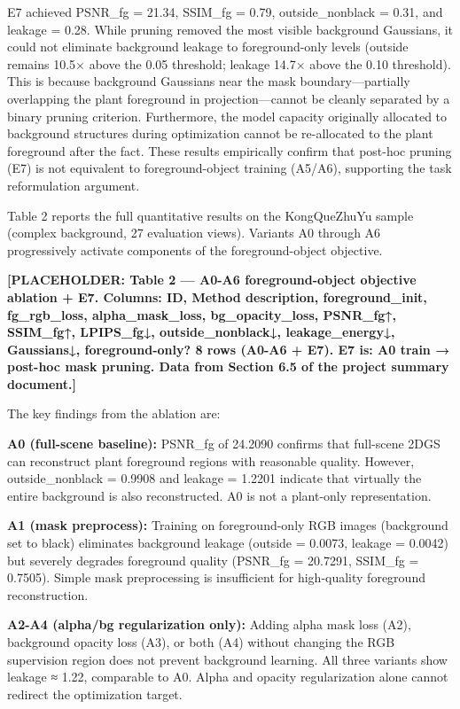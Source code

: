 \documentclass[11pt,a4paper]{article}
\begin{document}
E7 achieved PSNR\_fg = 21.34, SSIM\_fg = 0.79, outside\_nonblack = 0.31,
and leakage = 0.28. While pruning removed the most visible background
Gaussians, it could not eliminate background leakage to foreground-only
levels (outside remains 10.5× above the 0.05 threshold; leakage 14.7×
above the 0.10 threshold). This is because background Gaussians near the
mask boundary---partially overlapping the plant foreground in
projection---cannot be cleanly separated by a binary pruning criterion.
Furthermore, the model capacity originally allocated to background
structures during optimization cannot be re-allocated to the plant
foreground after the fact. These results empirically confirm that
post-hoc pruning (E7) is not equivalent to foreground-object training
(A5/A6), supporting the task reformulation argument.

Table 2 reports the full quantitative results on the KongQueZhuYu sample
(complex background, 27 evaluation views). Variants A0 through A6
progressively activate components of the foreground-object objective.

\textbf{{[}PLACEHOLDER: Table 2 --- A0-A6 foreground-object objective
ablation + E7. Columns: ID, Method description, foreground\_init,
fg\_rgb\_loss, alpha\_mask\_loss, bg\_opacity\_loss, PSNR\_fg↑,
SSIM\_fg↑, LPIPS\_fg↓, outside\_nonblack↓, leakage\_energy↓, Gaussians↓,
foreground-only? 8 rows (A0-A6 + E7). E7 is: A0 train → post-hoc mask
pruning. Data from Section 6.5 of the project summary document.{]}}

The key findings from the ablation are:

\textbf{A0 (full-scene baseline):} PSNR\_fg of 24.2090 confirms that
full-scene 2DGS can reconstruct plant foreground regions with reasonable
quality. However, outside\_nonblack = 0.9908 and leakage = 1.2201
indicate that virtually the entire background is also reconstructed. A0
is not a plant-only representation.

\textbf{A1 (mask preprocess):} Training on foreground-only RGB images
(background set to black) eliminates background leakage (outside =
0.0073, leakage = 0.0042) but severely degrades foreground quality
(PSNR\_fg = 20.7291, SSIM\_fg = 0.7505). Simple mask preprocessing is
insufficient for high-quality foreground reconstruction.

\textbf{A2-A4 (alpha/bg regularization only):} Adding alpha mask loss
(A2), background opacity loss (A3), or both (A4) without changing the
RGB supervision region does not prevent background learning. All three
variants show leakage ≈ 1.22, comparable to A0. Alpha and opacity
regularization alone cannot redirect the optimization target.
\end{document}

